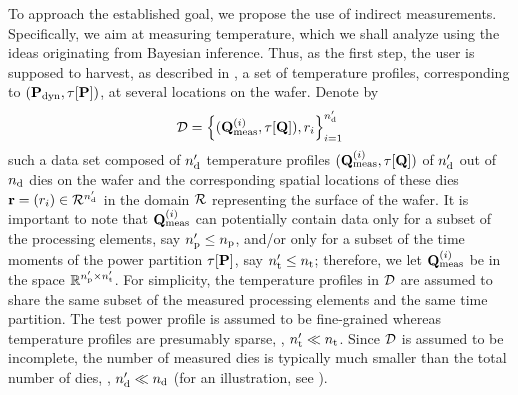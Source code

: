 To approach the established goal, we propose the use of indirect measurements. Specifically, we aim at measuring temperature, which we shall analyze using the ideas originating from Bayesian inference. Thus, as the first step, the user is supposed to harvest, as described in , a set of temperature profiles, corresponding to $(\mathbf{P}_{\text{dyn}}, \tau[\mathbf{P}])$, at several locations on the wafer. Denote by
\[
  \mathcal{D} = \left\{ (\mathbf{Q}^{(i)}_{\text{meas}}, \tau[\mathbf{Q}]), r_i \right\}_{i = 1}^{n_\text{d}'}
\]
such a data set composed of ${n_\text{d}'}$ temperature profiles $(\mathbf{Q}^{(i)}_{\text{meas}}, \tau[\mathbf{Q}])$ of ${n_\text{d}'}$ out of ${n_\text{d}}$ dies on the wafer and the corresponding spatial locations of these dies $\mathbf{r} = (r_i) \in \mathcal{R}^{n_\text{d}'}$ in the domain $\mathcal{R}$ representing the surface of the wafer.
It is important to note that $\mathbf{Q}^{(i)}_{\text{meas}}$ can potentially contain data only for a subset of the processing elements, say ${n_\text{p}'} \leq {n_\text{p}}$, and/or only for a subset of the time moments of the power partition $\tau[\mathbf{P}]$, say ${n_\text{t}'} \leq {n_\text{t}}$; therefore, we let $\mathbf{Q}^{(i)}_{\text{meas}}$ be in the space $\mathbb{R}^{{n_\text{p}'} \times {n_\text{t}'}}$.
For simplicity, the temperature profiles in $\mathcal{D}$ are assumed to share the same subset of the measured processing elements and the same time partition.
The test power profile is assumed to be fine-grained whereas temperature profiles are presumably sparse, \ie, ${n_\text{t}'} \ll {n_\text{t}}$.
Since $\mathcal{D}$ is assumed to be incomplete, the number of measured dies is typically much smaller than the total number of dies, \ie, ${n_\text{d}'} \ll {n_\text{d}}$ (for an illustration, see ).
